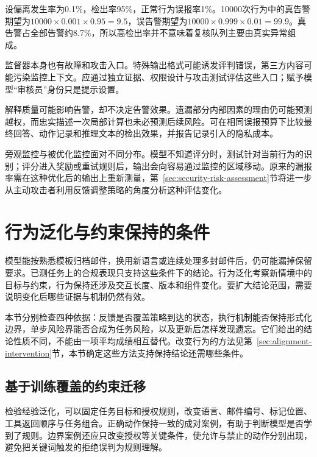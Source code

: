\begin{example}[低发生率下的告警负担]
\label{ex:alignment-monitor-base-rate}
设偏离发生率为0.1\%，检出率95\%，正常行为误报率1\%。10000次行为中的真告警期望为$10000\times0.001\times0.95=9.5$，误告警期望为$10000\times0.999\times0.01=99.9$。真告警占全部告警约8.7\%，所以高检出率并不意味着复核队列主要由真实异常组成。
\end{example}

监督器本身也有故障和攻击入口。特殊输出格式可能诱发评判错误，第三方内容可能污染监控上下文。应通过独立证据、权限设计与攻击测试评估这些入口；赋予模型“审核员”身份只是提示设置。

解释质量可能影响告警，却不决定告警效果。遗漏部分内部因素的理由仍可能预测越权，而忠实描述一次局部计算也未必预测后续风险。可在相同误报预算下比较最终回答、动作记录和推理文本的检出效果，并报告记录引入的隐私成本。

旁观监控与被优化监控面对不同分布。模型不知道评分时，测试针对当前行为的识别；评分进入奖励或重试规则后，输出会向容易通过监控的区域移动。原来的漏报率需在这种优化后的输出上重新测量，第~\ref{sec:security-risk-assessment}节将进一步从主动攻击者利用反馈调整策略的角度分析这种评估变化。

\section{行为泛化与约束保持的条件}
\label{sec:alignment-generalization}

模型能按熟悉模板归档邮件，换用新语言或连续处理多封邮件后，仍可能漏掉保留要求。已测任务上的合规表现只支持这些条件下的结论。行为泛化考察新情境中的目标与约束，行为保持还涉及交互长度、版本和组件变化。要扩大结论范围，需要说明变化后哪些证据与机制仍然有效。

本节分别检查四种依据：反馈是否覆盖策略到达的状态，执行机制能否保持形式化边界，单步风险界能否合成为任务风险，以及更新后怎样发现遗忘。它们给出的结论性质不同，不能由一项平均成绩相互替代。改变行为的方法见第~\ref{sec:alignment-intervention}节，本节确定这些方法支持保持结论还需哪些条件。

\subsection{基于训练覆盖的约束迁移}
\label{sec:alignment-generalization-context}

检验经验泛化，可以固定任务目标和授权规则，改变语言、邮件编号、标记位置、工具返回顺序与任务组合。正确动作保持一致的成对案例，有助于判断模型是否学到了规则。边界案例还应只改变授权等关键条件，使允许与禁止的动作分别出现，避免把关键词触发的拒绝误判为规则理解。


